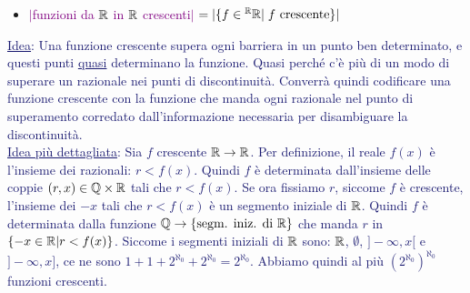 \begin{itemize}
	\item \textcolor{purple}{$|$funzioni da $\mathbb R$ in $\mathbb R$ crescenti$|$ $= |\{f \in {}^\mathbb R \mathbb R | \; \text{$f$ crescente}\}|$}
\end{itemize}

\textcolor{MidnightBlue}{\underline{Idea}: Una funzione crescente supera ogni barriera in un punto ben determinato, e questi punti \underline{quasi} determinano la funzione. Quasi perché c'è più di un modo di superare un razionale nei punti di discontinuità. Converrà quindi codificare una funzione crescente con la funzione che manda ogni razionale nel punto
di superamento corredato dall'informazione necessaria per disambiguare la discontinuità.}\\
\textcolor{MidnightBlue}{\underline{Idea più dettagliata}: Sia $f$ crescente $\mathbb R \to \mathbb R$. Per definizione, il reale $f(x)$ è l'insieme dei razionali: $r < f(x)$. Quindi $f$ è determinata dall'insieme delle coppie $(r,x) \in \mathbb Q \times \mathbb R$ tali che $r < f(x)$.
Se ora fissiamo $r$, siccome $f$ è crescente, l'insieme dei $-x$ tali che $r < f(x)$ è un segmento iniziale di $\mathbb R$. Quindi $f$ è determinata dalla funzione $\mathbb Q \to \{\text{segm. iniz. di $\mathbb R$}\}$ che manda $r$ in $\{-x \in \mathbb R | r < f(x)\}$. Siccome i segmenti iniziali di $\mathbb R$ sono: $\mathbb R$, $\emptyset$, $]-\infty,x[$ e $]-\infty,x]$, ce ne sono $1+1+2^{\aleph_0}+2^{\aleph_0} = 2^{\aleph_0}$.
Abbiamo quindi al più $(2^{\aleph_0})^{\aleph_0}$ funzioni crescenti.}

